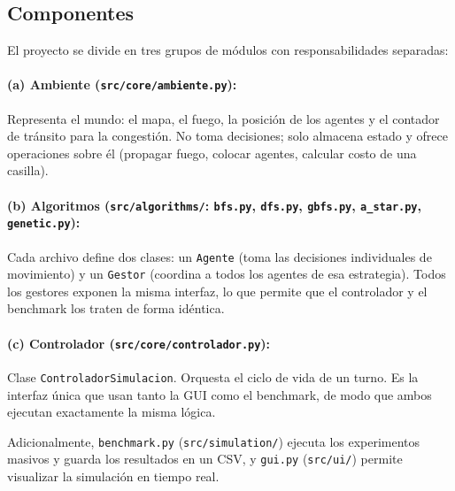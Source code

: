 \documentclass[11pt,a4paper]{article}
\begin{document}
\subsection{Componentes}
El proyecto se divide en tres grupos de módulos con responsabilidades separadas:

\paragraph{(a) Ambiente (\texttt{src/core/ambiente.py}):}
Representa el mundo: el mapa, el fuego, la posición de los agentes y el contador de tránsito para la congestión. No toma decisiones; solo almacena estado y ofrece operaciones sobre él (propagar fuego, colocar agentes, calcular costo de una casilla).

\paragraph{(b) Algoritmos (\texttt{src/algorithms/}: \texttt{bfs.py}, \texttt{dfs.py}, \texttt{gbfs.py}, \texttt{a\_star.py}, \texttt{genetic.py}):}
Cada archivo define dos clases: un \texttt{Agente} (toma las decisiones individuales de movimiento) y un \texttt{Gestor} (coordina a todos los agentes de esa estrategia). Todos los gestores exponen la misma interfaz, lo que permite que el controlador y el benchmark los traten de forma idéntica.

\paragraph{(c) Controlador (\texttt{src/core/controlador.py}):}
Clase \texttt{ControladorSimulacion}. Orquesta el ciclo de vida de un turno. Es la interfaz única que usan tanto la GUI como el benchmark, de modo que ambos ejecutan exactamente la misma lógica.

Adicionalmente, \texttt{benchmark.py} (\texttt{src/simulation/}) ejecuta los experimentos masivos y guarda los resultados en un CSV, y \texttt{gui.py} (\texttt{src/ui/}) permite visualizar la simulación en tiempo real.
\end{document}
